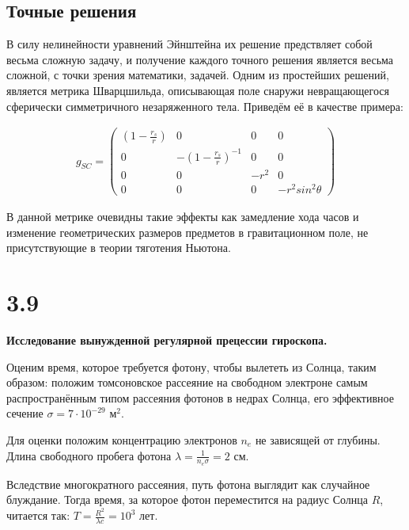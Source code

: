 \documentclass[a4paper,14pt]{article}
\begin{document}
\subsection*{Точные решения}

	В силу нелинейности уравнений Эйнштейна их решение предствляет собой весьма сложную задачу, и получение каждого точного решения является весьма сложной, с точки зрения математики, задачей. Одним из простейших решений, является метрика Шварцшильда, описывающая поле снаружи невращающегося сферически симметричного незаряженного тела. Приведём её в качестве примера:

	\begin{align*}
		g_{SC} =
		\left( \begin{array}{cccc}
			(1-\frac{r_s}{r}) & 0                       & 0    & 0                \\
			0                 & -(1-\frac{r_s}{r})^{-1} & 0    & 0                \\
			0                 & 0                       & -r^2 & 0                \\
			0                 & 0                       & 0    & -r^2 sin^2 \theta 
		\end{array} \right)
	\end{align*}

	В данной метрике очевидны такие эффекты как замедление хода часов и изменение геометрических размеров предметов в гравитационном поле, не присутствующие в теории тяготения Ньютона. 


\section*{3.9}

\begin{center}
	\LARGE{\textbf{Исследование вынужденной регулярной прецессии гироскопа.}}\\
\end{center}

Оценим время, которое требуется фотону, чтобы вылететь из Солнца, таким образом: положим томсоновское рассеяние на свободном электроне самым распространённым типом рассеяния фотонов в недрах Солнца, его эффективное сечение $\sigma = 7 \cdot 10^{-29} \text{ м}^2$.

Для оценки положим концентрацию электронов $n_e$ не зависящей от глубины. Длина свободного пробега фотона $\lambda = \frac{1}{n_e \sigma} = 2 \text{ см}$.

Вследствие многократного рассеяния, путь фотона выглядит как случайное блуждание. Тогда время, за которое фотон переместится на радиус Солнца $R$, читается так:
$T = \frac{R^2}{\lambda c} = 10^3 \text{ лет}.$
\end{document}
